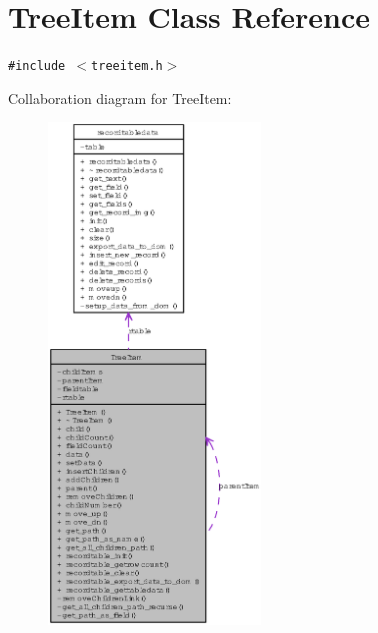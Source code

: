 \section{Tree\-Item Class Reference}
\label{classTreeItem}
{\tt \#include $<$treeitem.h$>$}

Collaboration diagram for Tree\-Item:\begin{figure}[H]
\begin{center}
\leavevmode
\includegraphics[width=160pt]{classTreeItem__coll__graph}
\end{center}
\end{figure}
